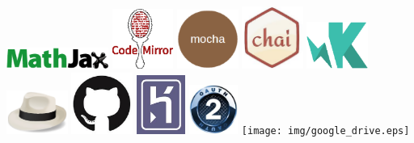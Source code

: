 \documentclass{beamer}
\begin{document}
\begin{frame}
  \hspace*{1.2cm}
  \includegraphics[width=0.25\textwidth]{img/mathjax.eps}
  \newline
  \newline
  \includegraphics[width=0.15\textwidth]{img/codemirror.eps}
  \hspace*{1.2cm}
  \includegraphics[width=0.15\textwidth]{img/mocha.eps}
  \hspace*{1.2cm}
  \includegraphics[width=0.15\textwidth]{img/chai.eps}
  \hspace*{1.2cm}
  \includegraphics[width=0.15\textwidth]{img/karma.eps}
  \newline
  \newline
  \includegraphics[width=0.15\textwidth]{img/sinatra.eps}
  \hspace*{1.0cm}
  \includegraphics[width=0.15\textwidth]{img/github.eps}
  \hspace*{1.0cm}
  \includegraphics[width=0.12\textwidth]{img/heroku.eps}
  \hspace*{1.0cm}
  \includegraphics[width=0.12\textwidth]{img/oauth.eps}
  \hspace*{1.0cm}
  \texttt{[image: img/google\_drive.eps]}
\end{frame}
\end{document}
